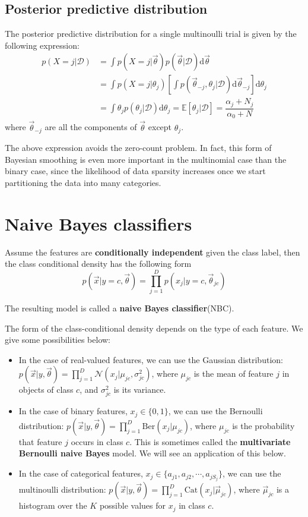 \subsection{Posterior predictive distribution}
The posterior predictive distribution for a single multinoulli trial is given by the following expression:
\begin{align}
p(X=j|\mathcal{D})& =\int p(X=j|\vec{\theta})p(\vec{\theta}|\mathcal{D})\mathrm{d}\vec{\theta} \\
    & =\int p(X=j|\theta_j)\left[\int p(\vec{\theta}_{-j}, \theta_j|\mathcal{D})\mathrm{d}\vec{\theta}_{-j}\right]\mathrm{d}\theta_j \\
	& =\int \theta_jp(\theta_j|\mathcal{D})\mathrm{d}\theta_j=\mathbb{E}[\theta_j|\mathcal{D}]=\dfrac{\alpha_j+N_j}{\alpha_0+N}
\end{align}
where $\vec{\theta}_{-j}$ are all the components of $\vec{\theta}$ except $\theta_j$.

The above expression avoids the zero-count problem. In fact, this form of Bayesian smoothing is even more important in the multinomial case than the binary case, since the likelihood of data sparsity increases once we start partitioning the data into many categories.


\section{Naive Bayes classifiers}
\label{sec:NBC}
Assume the features are \textbf{conditionally independent} given the class label, then the class conditional density has the following form
\begin{equation}
p(\vec{x}|y=c,\vec{\theta})=\prod\limits_{j=1}^D p(x_j|y=c,\vec{\theta}_{jc})
\end{equation}

The resulting model is called a \textbf{naive Bayes classifier}(NBC).

The form of the class-conditional density depends on the type of each feature. We give some possibilities below:
\begin{itemize}
\item{In the case of real-valued features, we can use the Gaussian distribution: $p(\vec{x}|y,\vec{\theta})=\prod_{j=1}^D \mathcal{N}(x_j|\mu_{jc},\sigma_{jc}^2)$, where $\mu_{jc}$ is the mean of feature $j$ in objects of class $c$, and $\sigma_{jc}^2$ is its variance.}
\item{In the case of binary features, $x_j \in \{0,1\}$, we can use the Bernoulli distribution: $p(\vec{x}|y,\vec{\theta})=\prod_{j=1}^D \text{Ber}(x_j|\mu_{jc})$, where $\mu_{jc}$ is the probability that feature $j$ occurs in class $c$. This is sometimes called the \textbf{multivariate Bernoulli naive Bayes} model. We will see an application of this below.}
\item{In the case of categorical features, $x_j \in \{a_{j1},a_{j2},\cdots, a_{jS_j}\}$, we can use the multinoulli distribution: $p(\vec{x}|y,\vec{\theta})=\prod_{j=1}^D \text{Cat}(x_j|\vec{\mu}_{jc})$, where $\vec{\mu}_{jc}$ is a histogram over the $K$ possible values for $x_j$ in class $c$.}
\end{itemize}

